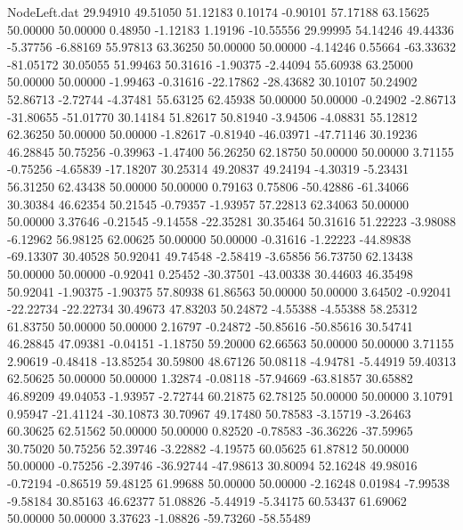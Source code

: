 \begin{filecontents}{NodeLeft.dat}
  29.94910   49.51050   51.12183     0.10174   -0.90101   57.17188   63.15625   50.00000   50.00000    0.48950   -1.12183    1.19196  -10.55556
  29.99995   54.14246   49.44336    -5.37756   -6.88169   55.97813   63.36250   50.00000   50.00000   -4.14246    0.55664  -63.33632  -81.05172
  30.05055   51.99463   50.31616    -1.90375   -2.44094   55.60938   63.25000   50.00000   50.00000   -1.99463   -0.31616  -22.17862  -28.43682
  30.10107   50.24902   52.86713    -2.72744   -4.37481   55.63125   62.45938   50.00000   50.00000   -0.24902   -2.86713  -31.80655  -51.01770
  30.14184   51.82617   50.81940    -3.94506   -4.08831   55.12812   62.36250   50.00000   50.00000   -1.82617   -0.81940  -46.03971  -47.71146
  30.19236   46.28845   50.75256    -0.39963   -1.47400   56.26250   62.18750   50.00000   50.00000    3.71155   -0.75256   -4.65839  -17.18207
  30.25314   49.20837   49.24194    -4.30319   -5.23431   56.31250   62.43438   50.00000   50.00000    0.79163    0.75806  -50.42886  -61.34066
  30.30384   46.62354   50.21545    -0.79357   -1.93957   57.22813   62.34063   50.00000   50.00000    3.37646   -0.21545   -9.14558  -22.35281
  30.35464   50.31616   51.22223    -3.98088   -6.12962   56.98125   62.00625   50.00000   50.00000   -0.31616   -1.22223  -44.89838  -69.13307
  30.40528   50.92041   49.74548    -2.58419   -3.65856   56.73750   62.13438   50.00000   50.00000   -0.92041    0.25452  -30.37501  -43.00338
  30.44603   46.35498   50.92041    -1.90375   -1.90375   57.80938   61.86563   50.00000   50.00000    3.64502   -0.92041  -22.22734  -22.22734
  30.49673   47.83203   50.24872    -4.55388   -4.55388   58.25312   61.83750   50.00000   50.00000    2.16797   -0.24872  -50.85616  -50.85616
  30.54741   46.28845   47.09381    -0.04151   -1.18750   59.20000   62.66563   50.00000   50.00000    3.71155    2.90619   -0.48418  -13.85254
  30.59800   48.67126   50.08118    -4.94781   -5.44919   59.40313   62.50625   50.00000   50.00000    1.32874   -0.08118  -57.94669  -63.81857
  30.65882   46.89209   49.04053    -1.93957   -2.72744   60.21875   62.78125   50.00000   50.00000    3.10791    0.95947  -21.41124  -30.10873
  30.70967   49.17480   50.78583    -3.15719   -3.26463   60.30625   62.51562   50.00000   50.00000    0.82520   -0.78583  -36.36226  -37.59965
  30.75020   50.75256   52.39746    -3.22882   -4.19575   60.05625   61.87812   50.00000   50.00000   -0.75256   -2.39746  -36.92744  -47.98613
  30.80094   52.16248   49.98016    -0.72194   -0.86519   59.48125   61.99688   50.00000   50.00000   -2.16248    0.01984   -7.99538   -9.58184
  30.85163   46.62377   51.08826    -5.44919   -5.34175   60.53437   61.69062   50.00000   50.00000    3.37623   -1.08826  -59.73260  -58.55489

\end{filecontents}
